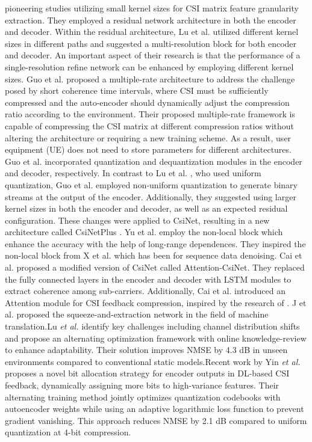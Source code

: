\documentclass[lettersize,journal]{IEEEtran}
\begin{document}
pioneering studies utilizing small kernel sizes for CSI matrix feature granularity extraction. They employed a residual network architecture in both the encoder and decoder. Within the residual architecture, Lu et al. utilized different kernel sizes in different paths and suggested a multi-resolution block for both encoder and decoder. An important aspect of their research is that the performance of a single-resolution refine network can be enhanced by employing different kernel sizes. Guo et al. \cite{abo} proposed a multiple-rate architecture to address the challenge posed by short coherence time intervals, where CSI must be sufficiently compressed and the auto-encoder should dynamically adjust the compression ratio according to the environment. Their proposed multiple-rate framework is capable of compressing the CSI matrix at different compression ratios without altering the architecture or requiring a new training scheme. As a result, user equipment (UE) does not need to store parameters for different architectures. Guo et al. incorporated quantization and dequantization modules in the encoder and decoder, respectively. In contrast to Lu et al. \cite{abp}, who used uniform quantization, Guo et al.\cite{abo} employed non-uniform quantization to generate binary streams at the output of the encoder. Additionally, they suggested using larger kernel sizes in both the encoder and decoder, as well as an expected residual configuration. These changes were applied to CsiNet, resulting in a new architecture called CsiNetPlus \cite{abo}. Yu et al. \cite{abq} employ the non-local block which enhance the accuracy with the help of long-range dependences. They inspired the non-local block from X et al. \cite{abr} which has been for sequence data denoising. Cai et al. \cite{abs} proposed a modified version of CsiNet called Attention-CsiNet. They replaced the fully connected layers in the encoder and decoder with LSTM modules to extract coherence among sub-carriers. Additionally, Cai et al. \cite{abs} introduced an Attention module for CSI feedback compression, inspired by the research of \cite{abt}. J et al. \cite{abt} proposed the squeeze-and-extraction network in the field of machine translation.Lu \textit{et al.} \cite{prac2024} identify key challenges including channel distribution shifts and propose an alternating optimization framework with online knowledge-review to enhance adaptability. Their solution improves NMSE by 4.3 dB in unseen environments compared to conventional static models.Recent work by Yin \textit{et al.} \cite{quant2024} proposes a novel bit allocation strategy for encoder outputs in DL-based CSI feedback, dynamically assigning more bits to high-variance features. Their alternating training method jointly optimizes quantization codebooks with autoencoder weights while using an adaptive logarithmic loss function to prevent gradient vanishing. This approach reduces NMSE by 2.1 dB compared to uniform quantization at 4-bit compression.
\end{document}
